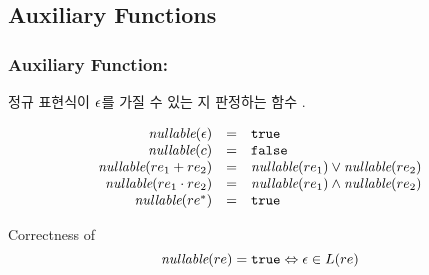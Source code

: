 \subsection{Auxiliary Functions}\label{sec:aux}

\begin{frame}[shrink]
\frametitle{Auxiliary Function: \nullable}

정규 표현식이 $\epsilon$를 가질 수 있는 지 판정하는 함수 \nullable.

\[
\begin{array}{rcl}
  \textit{nullable}(\epsilon) & = & \mbox{\tt true} \\
  \textit{nullable}(c) & = & \mbox{\tt false} \\
  \textit{nullable}(re_{1}+re_{2}) & = & \textit{nullable}(re_{1}) \vee \textit{nullable}(re_{2}) \\
  \textit{nullable}(re_{1}\cdot re_{2}) & = & \textit{nullable}(re_{1})\wedge\textit{nullable}(re_{2}) \\
  \textit{nullable}(re^{*}) & = & \mbox{\tt true}
\end{array}
\]  

\begin{block}{Correctness of \nullable}
 \[
     \textit{nullable}(re) = \mbox{\tt true} \Leftrightarrow \epsilon \in L(re)
 \]
\end{block}

\end{frame}

